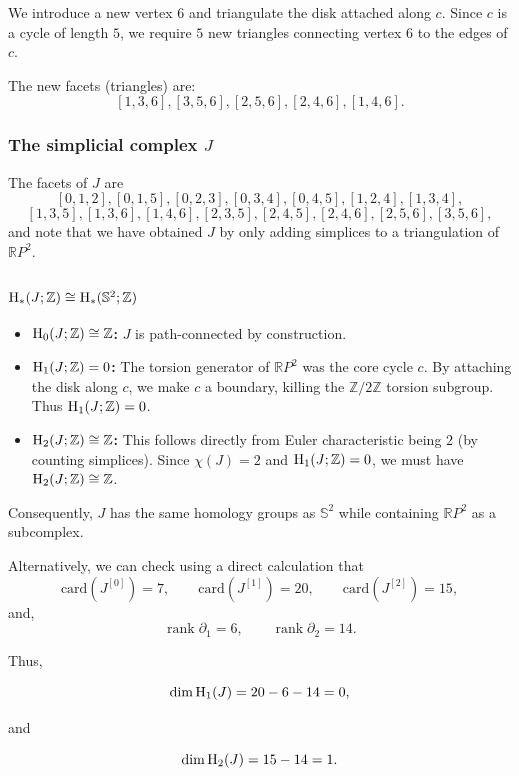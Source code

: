 \documentclass[11pt]{amsart}
\theoremstyle{theorem}
\theoremstyle{remark}
\theoremstyle{definition}
\newcommand{\card}{\mathrm{card}}
\newcommand{\HH}  {\mbox{\rm H}}
\begin{document}
\noindent We introduce a new vertex $6$ and triangulate the disk attached along $c$. Since $c$ is a cycle of length $5$, we require $5$ new triangles connecting vertex $6$ to the edges of $c$.

\noindent The new facets (triangles) are:
$$[1, 3, 6], [3, 5, 6], [2, 5, 6], [2, 4, 6], [1, 4, 6].$$

\subsubsection{The simplicial complex $J$}
The facets of $J$ are
$$[0, 1, 2], [0, 1, 5], [0, 2, 3], [0, 3, 4], [0, 4, 5], [1, 2, 4], [1, 3, 4],$$
$$[1, 3, 5], [1, 3, 6], [1, 4, 6], [2, 3, 5], [2, 4, 5], [2, 4, 6], [2, 5, 6],[3, 5, 6],$$
and note that we have obtained $J$ by only adding simplices to a triangulation of $\mathbb{R}P^2$.
\subsubsection*{$\HH_*(J;\mathbb{Z}) \cong \HH_*(\mathbb{S}^2;\mathbb{Z})$}
\begin{itemize}
    \item \textbf{$\HH_0(J;\mathbb{Z}) \cong \mathbb{Z}$:} $J$ is path-connected by construction.
    \item \textbf{$\HH_1(J;\mathbb{Z}) = 0$:} The torsion generator of $\mathbb{R}P^2$ was the core cycle $c$. By attaching the disk along $c$, we make $c$ a boundary, killing the $\mathbb{Z}/2\mathbb{Z}$ torsion subgroup. Thus $\HH_1(J;\mathbb{Z}) = 0$.
    \item \textbf{$\HH_2(J;\mathbb{Z}) \cong \mathbb{Z}$:} This follows directly from Euler characteristic being $2$ (by counting simplices). 
    Since $\chi(J) = 2$ and $\HH_1(J;\mathbb{Z}) = 0$, we must have $\HH_2(J;\mathbb{Z}) \cong \mathbb{Z}$.
\end{itemize}

Consequently, $J$ has the same homology groups as $\mathbb{S}^2$ while containing $\mathbb{R}P^2$ as a subcomplex.

Alternatively, we can check using a direct calculation that
\[
\card(J^{[0]}) =7,\qquad \card(J^{[1]}) =20,\qquad \card(J^{[2]})=15,
\]
and,
\[
\operatorname{rank}\partial_1=6,
\qquad
\operatorname{rank}\partial_2=14.
\]

Thus,

\[
\dim \HH_1(J)=20-6-14=0,
\]

and

\[
\dim \HH_2(J)=15-14=1.
\]
\end{document}

